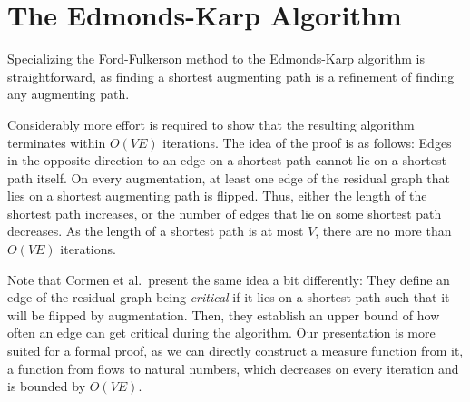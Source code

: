 \documentclass[smallcondensed]{svjour3}     %
\begin{document}
% 
% 
% 
% 
% 
% 
% 
% 




\section{The Edmonds-Karp Algorithm}\label{sec:edka}
  Specializing the Ford-Fulkerson method to the Edmonds-Karp algorithm is straightforward, as finding a shortest augmenting path is a refinement of finding any augmenting path.
  
  Considerably more effort is required to show that the resulting algorithm terminates within $O(VE)$ iterations. 
  The idea of the proof is as follows: Edges in the opposite direction to an edge on a shortest path cannot lie 
  on a shortest path itself.
  On every augmentation, at least one edge of the residual graph that lies on a shortest augmenting path is flipped. Thus, either the length of the shortest path increases,
  or the number of edges that lie on some shortest path decreases. As the length of a shortest path is at most $V$, there are no more than $O(VE)$ iterations.
  
  Note that Cormen et al.~present the same idea a bit differently: They define an edge of the residual graph being \emph{critical} if it lies on a shortest path such that it will be flipped by augmentation. Then, they establish an upper bound of how often an edge can get critical during the algorithm. Our presentation is more suited for a formal proof, as we can directly construct a measure function from it, \ie a function from flows to natural numbers, which decreases on every iteration and is bounded by $O(VE)$. 
  
\end{document}
